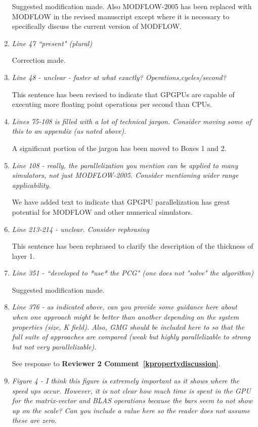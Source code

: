 \documentclass[12pt]{article} %
\begin{document}
\begin{enumerate}
Suggested modification made. Also MODFLOW-2005 has been replaced with MODFLOW in the revised manuscript except where it is necessary to specifically discuss the current version of MODFLOW.

\item \textit{Line 47 ``present" (plural)} 

Correction made. 

\item \textit{Line 48 - unclear - faster at what exactly? Operations,cycles/second? } 

This sentence has been revised to indicate that GPGPUs are capable of executing more floating point operations per second than CPUs.

\item \textit{Lines 75-108 is filled with a lot of technical jargon. Consider moving some of this to an appendix (as noted above). } 

A significant portion of the jargon has been moved to Boxes 1 and 2.

\item \textit{Line 108 - really, the parallelization you mention can be applied to many simulators, not just MODFLOW-2005. Consider mentioning wider range applicability. } 

We have added text to indicate that GPGPU parallelization has great potential for MODFLOW and other numerical simulators.

\item \textit{Line 213-214 - unclear. Consider rephrasing } 

This sentence has been rephrased to clarify the description of the thickness of layer 1.

\item \textit{Line 351 - ``developed to *use* the PCG" (one does not "solve" the algorithm) } 

Suggested modification made.

\item \textit{Line 376 - as indicated above, can you provide some guidance here about when one approach might be better than another depending on the system properties (size, K field). Also, GMG should be included here to so that the full suite of approaches are compared (weak but highly parallelizable to strong but not very parallelizable). } 

See response to \textbf{Reviewer 2 Comment~\ref{kpropertydiscussion}}.

\item \textit{Figure 4 - I think this figure is extremely important as it shows where the speed ups occur. However, it is not clear how much time is spent in the GPU for the matrix-vector and BLAS operations because the bars seem to not show up on the scale? Can you include a value here so the reader does not assume these are zero. } 


\end{enumerate}
\end{document}
